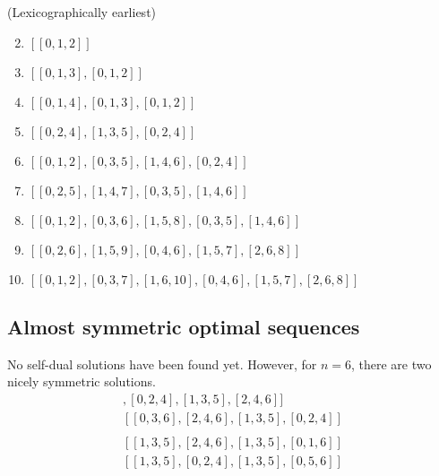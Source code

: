 \documentclass[12pt]{article}
\theoremstyle{pf}
\begin{document}
(Lexicographically earliest)
\begin{enumerate}
    \setcounter{enumi}{1}
    \item $[[0,1,2]]$
    \item $[[0,1,3], [0,1,2]]$
    \item $[[0,1,4], [0,1,3], [0,1,2]]$
    \item $[[0,2,4], [1,3,5], [0,2,4]]$
    \item $[[0, 1, 2], [0, 3, 5], [1, 4, 6], [0, 2, 4]]$
    \item $[[0, 2, 5], [1, 4, 7], [0, 3, 5], [1, 4, 6]]$
    \item $[[0, 1, 2], [0, 3, 6], [1, 5, 8], [0, 3, 5], [1, 4, 6]]$
    \item $[[0, 2, 6], [1, 5, 9], [0, 4, 6], [1, 5, 7], [2, 6, 8]]$
    \item $[[0, 1, 2], [0, 3, 7], [1, 6, 10], [0, 4, 6], [1, 5, 7], [2, 6, 8]]$
\end{enumerate}

\subsection{Almost symmetric optimal sequences}
No self-dual solutions have been found yet. However,
for $n =6$, there are two nicely symmetric solutions.
\begin{align*}
    [[0, 3, 6], [0, 2, 4], [1, 3, 5], [2, 4, 6]]\\
    [[0, 3, 6], [2, 4, 6], [1, 3, 5], [0, 2, 4]]\\
    \\
    [[1, 3, 5], [2, 4, 6], [1, 3, 5], [0, 1, 6]]\\
    [[1, 3, 5], [0, 2, 4], [1, 3, 5], [0, 5, 6]]
\end{align*}
\end{document}
